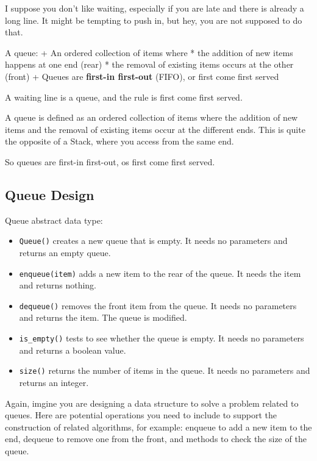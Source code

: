 \documentclass[
  letterpaper,
]{scrbook}
\providecommand{\tightlist}{%
  \setlength{\itemsep}{0pt}\setlength{\parskip}{0pt}}
\begin{document}

I suppose you don't like waiting, especially if you are late and there
is already a long line. It might be tempting to push in, but hey, you
are not supposed to do that.

A queue: + An ordered collection of items where * the addition of new
items happens at one end (rear) * the removal of existing items occurs
at the other (front) + Queues are \textbf{first-in first-out} (FIFO), or
first come first served

A waiting line is a queue, and the rule is first come first served.

A queue is defined as an ordered collection of items where the addition
of new items and the removal of existing items occur at the different
ends. This is quite the opposite of a Stack, where you access from the
same end.

So queues are first-in first-out, os first come first served.

\subsection*{Queue Design}\label{queue-design}

Queue abstract data type:

\begin{itemize}
\tightlist
\item
  \texttt{Queue()} creates a new queue that is empty. It needs no
  parameters and returns an empty queue.
\item
  \texttt{enqueue(item)} adds a new item to the rear of the queue. It
  needs the item and returns nothing.
\item
  \texttt{dequeue()} removes the front item from the queue. It needs no
  parameters and returns the item. The queue is modified.
\item
  \texttt{is\_empty()} tests to see whether the queue is empty. It needs
  no parameters and returns a boolean value.
\item
  \texttt{size()} returns the number of items in the queue. It needs no
  parameters and returns an integer.
\end{itemize}

Again, imgine you are designing a data structure to solve a problem
related to queues. Here are potential operations you need to include to
support the construction of related algorithms, for example: enqueue to
add a new item to the end, dequeue to remove one from the front, and
methods to check the size of the queue.
\end{document}
